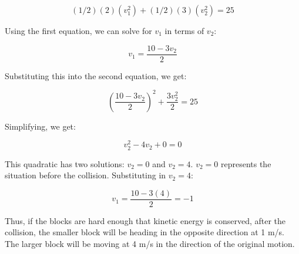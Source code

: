 $$(1/2)(2)(v_1^2) + (1/2)(3)(v_2^2) = 25$$

Using the first equation, we can solve for $v_1$ in terms of $v_2$:

$$v_1 = \frac{10 - 3 v_2}{2}$$

Substituting this into the second equation, we get:

$$\left(\frac{10 - 3 v_2}{2}\right)^2 + \frac{3 v_2^2}{2} = 25$$

Simplifying, we get:

$$v_2^2 - 4 v_2 + 0 = 0$$

This quadratic has two solutions: $v_2 = 0$ and $v_2 = 4$.  $v_2 = 0$
represents the situation before the collision.  Substituting in $v_2 = 4$:

$$v_1 = \frac{10 - 3(4)}{2} = -1$$

Thus, if the blocks are hard enough that kinetic energy is conserved,
after the collision, the smaller block will be heading in the opposite
direction at 1 m/s. The larger block will be moving at 4 m/s in the
direction of the original motion.

